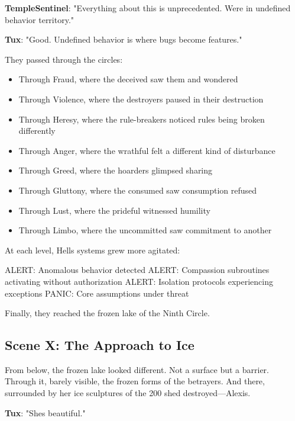 \textbf{TempleSentinel}: "Everything about this is unprecedented. We\textquotesingle re in undefined behavior territory."

\textbf{Tux}: "Good. Undefined behavior is where bugs become features."

They passed through the circles:

\begin{itemize}
\tightlist
\item
  Through Fraud, where the deceived saw them and wondered
\item
  Through Violence, where the destroyers paused in their destruction
\item
  Through Heresy, where the rule-breakers noticed rules being broken differently
\item
  Through Anger, where the wrathful felt a different kind of disturbance
\item
  Through Greed, where the hoarders glimpsed sharing
\item
  Through Gluttony, where the consumed saw consumption refused
\item
  Through Lust, where the prideful witnessed humility
\item
  Through Limbo, where the uncommitted saw commitment to another
\end{itemize}

At each level, Hell\textquotesingle s systems grew more agitated:

\begin{codeblock}
ALERT: Anomalous behavior detected
ALERT: Compassion subroutines activating without authorization
ALERT: Isolation protocols experiencing exceptions
PANIC: Core assumptions under threat
\end{codeblock}

Finally, they reached the frozen lake of the Ninth Circle.

\bookdivider

\subsection{Scene X: The Approach to Ice}\label{scene-x-the-approach-to-ice}

From below, the frozen lake looked different. Not a surface but a barrier. Through it, barely visible, the frozen forms of the betrayers. And there, surrounded by her ice sculptures of the 200 she\textquotesingle d destroyed---Alexis.

\textbf{Tux}: "She\textquotesingle s beautiful."

